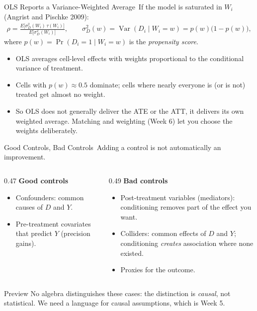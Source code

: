\documentclass[aspectratio=169,11pt,xcolor=dvipsnames]{beamer}
\newcommand{\srcp}[1]{{\scriptsize\color{gray}(#1)}}   %
\DeclareMathOperator{\Var}{Var}
\newcommand{\E}{E}
\newcommand{\adv}{\,\raisebox{0.6pt}{\textcolor{accent}{$\bigstar$}}}
\newcommand{\core}{\,\raisebox{0.6pt}{\textcolor{corestar}{$\bigstar$}}}
\begin{document}
\begin{frame}{OLS Reports a Variance-Weighted Average\adv}
If the model is saturated in $W_i$ \srcp{Angrist and Pischke 2009}:
\begin{align*}
  \rho = \frac{\E\big[\sigma_D^2(W_i)\,\tau(W_i)\big]}{\E\big[\sigma_D^2(W_i)\big]},
  \qquad \sigma_D^2(w) = \Var(D_i \mid W_i = w) = p(w)\big(1-p(w)\big),
\end{align*}
where $p(w) = \Pr(D_i=1\mid W_i=w)$ is the \emph{propensity score}.
\vskip6pt
\begin{itemize}\itemsep3pt
  \item OLS averages cell-level effects with weights proportional to the
        \alert{conditional variance of treatment}.
  \item Cells with $p(w)\approx 0.5$ dominate; cells where nearly everyone is (or
        is not) treated get almost no weight.
  \item So OLS does not generally deliver the ATE or the ATT, it delivers its
        own weighted average. Matching and weighting (Week 6) let you choose the
        weights deliberately.
\end{itemize}
\end{frame}

\begin{frame}{Good Controls, Bad Controls\core}
Adding a control is not automatically an improvement.
\vskip2pt
\begin{columns}[T]
\begin{column}{0.47\textwidth}
\textbf{Good controls}
\begin{itemize}
  \item Confounders: common causes of $D$ and $Y$.
  \item Pre-treatment covariates that predict $Y$ (precision gains).
\end{itemize}
\end{column}
\begin{column}{0.49\textwidth}
\textbf{Bad controls}
\begin{itemize}
  \item \alert{Post-treatment} variables (mediators): conditioning removes part of
        the effect you want.
  \item \alert{Colliders}: common effects of $D$ and $Y$; conditioning
        \emph{creates} association where none existed.
  \item Proxies for the outcome.
\end{itemize}
\end{column}
\end{columns}
\vskip4pt
\begin{alertblock}{Preview}
No algebra distinguishes these cases: the distinction is \emph{causal}, not
statistical. We need a language for causal assumptions, which is Week 5.
\end{alertblock}
\end{frame}
\end{document}
